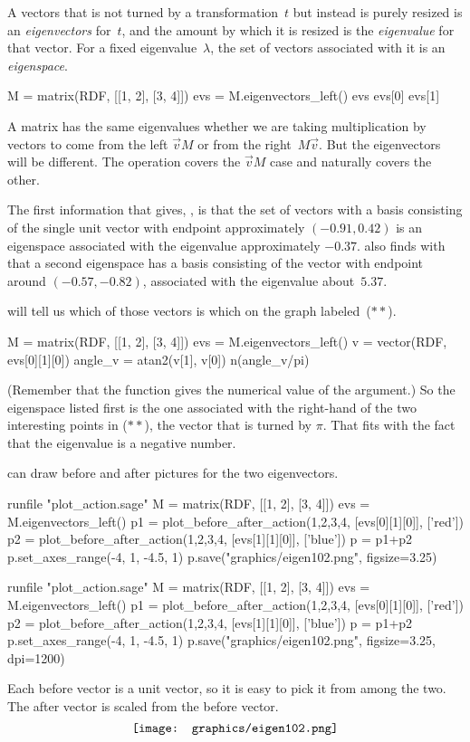 A vectors that is not turned by a transformation~$t$ but instead
is purely resized 
is an \textit{eigenvectors} for~$t$, and the amount by which it is 
resized is the \textit{eigenvalue} for that vector.
For a fixed eigenvalue~$\lambda$, the set of vectors associated with
it is an \textit{eigenspace}.
\begin{sageoutput}[s,3,59,13]
M = matrix(RDF, [[1, 2], [3, 4]])
evs = M.eigenvectors_left()
evs
evs[0] 
evs[1]
\end{sageoutput}
\noindent
A matrix has the same eigenvalues whether we are taking multiplication 
by vectors to come from the left $\vec{v}M$ or from the 
right~$M\vec{v}$.  
But the eigenvectors will be different. 
The \Sage{} operation  covers the 
$\vec{v}M$ case and naturally 
covers the other.

The first information that \Sage{} gives, , 
is that the set of vectors with a basis consisting of the single unit
vector with endpoint approximately $(-0.91, 0.42)$  is an
eigenspace associated with the eigenvalue approximately $-0.37$.
\Sage{} also finds with  that a second eigenspace
has a basis consisting of the vector with endpoint around
$(-0.57, -0.82)$, associated with the
eigenvalue about~$5.37$. 

\Sage{} will tell us which of those vectors is which on the graph 
labeled~($**$).
\begin{sageoutput}
M = matrix(RDF, [[1, 2], [3, 4]])
evs = M.eigenvectors_left()
v = vector(RDF, evs[0][1][0])
angle_v = atan2(v[1], v[0]) 
n(angle_v/pi) 
\end{sageoutput}
(Remember that the  function gives the numerical value of
the argument.)
So the eigenspace listed first is the one associated with the right-hand
of the two interesting points in ($**$), the vector that is turned by
$\pi$.
That fits with the fact that the eigenvalue is a negative number.

\Sage{} can draw before and after pictures for the two eigenvectors.
\begin{sageoutput}[d,0,3]
runfile "plot_action.sage"  
M = matrix(RDF, [[1, 2], [3, 4]])
evs = M.eigenvectors_left()  
p1 = plot_before_after_action(1,2,3,4, [evs[0][1][0]], ['red']) 
p2 = plot_before_after_action(1,2,3,4, [evs[1][1][0]], ['blue']) 
p = p1+p2
p.set_axes_range(-4, 1, -4.5, 1) 
p.save("graphics/eigen102.png", figsize=3.25)
\end{sageoutput}
\begin{sagesilent}
runfile "plot_action.sage"  
M = matrix(RDF, [[1, 2], [3, 4]])
evs = M.eigenvectors_left()  
p1 = plot_before_after_action(1,2,3,4, [evs[0][1][0]], ['red']) 
p2 = plot_before_after_action(1,2,3,4, [evs[1][1][0]], ['blue']) 
p = p1+p2
p.set_axes_range(-4, 1, -4.5, 1) 
p.save("graphics/eigen102.png", figsize=3.25, dpi=1200)
\end{sagesilent}
\noindent
Each before vector is a unit vector, so it is easy to pick it from among the
two.
The after vector is scaled from the before vector.
\begin{equation*}
  \vcenteredhbox{\texttt{[image: graphics/eigen102.png]}}
\end{equation*}


